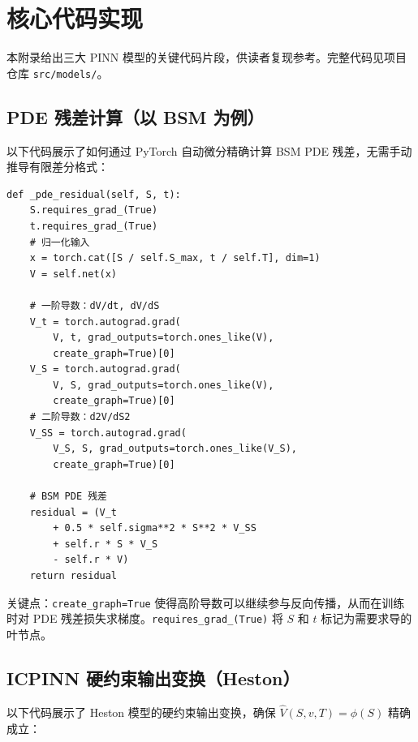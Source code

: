 \chapter{核心代码实现}\label{app:code}

本附录给出三大 PINN 模型的关键代码片段，供读者复现参考。完整代码见项目仓库 \texttt{src/models/}。

\section{PDE 残差计算（以 BSM 为例）}\label{app:pde_residual}

以下代码展示了如何通过 PyTorch 自动微分精确计算 BSM PDE 残差，无需手动推导有限差分格式：

\begin{verbatim}
def _pde_residual(self, S, t):
    S.requires_grad_(True)
    t.requires_grad_(True)
    # 归一化输入
    x = torch.cat([S / self.S_max, t / self.T], dim=1)
    V = self.net(x)

    # 一阶导数：dV/dt, dV/dS
    V_t = torch.autograd.grad(
        V, t, grad_outputs=torch.ones_like(V),
        create_graph=True)[0]
    V_S = torch.autograd.grad(
        V, S, grad_outputs=torch.ones_like(V),
        create_graph=True)[0]
    # 二阶导数：d2V/dS2
    V_SS = torch.autograd.grad(
        V_S, S, grad_outputs=torch.ones_like(V_S),
        create_graph=True)[0]

    # BSM PDE 残差
    residual = (V_t
        + 0.5 * self.sigma**2 * S**2 * V_SS
        + self.r * S * V_S
        - self.r * V)
    return residual
\end{verbatim}

关键点：\texttt{create\_graph=True} 使得高阶导数可以继续参与反向传播，从而在训练时对 PDE 残差损失求梯度。\texttt{requires\_grad\_(True)} 将 $S$ 和 $t$ 标记为需要求导的叶节点。

\section{ICPINN 硬约束输出变换（Heston）}\label{app:icpinn}

以下代码展示了 Heston 模型的硬约束输出变换，确保 $\hat{V}(S,v,T) = \phi(S)$ 精确成立：


